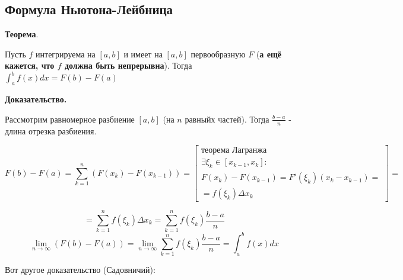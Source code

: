 \documentclass[a4paper]{article}
\begin{document}
\begin{definit}
\hypertarget{p13}{}
\subsection*{Формула Ньютона-Лейбница}

\begin{htheorem}\textbf{Теорема}.

Пусть $f$ интегрируема на $[a,b]$ и имеет на $[a,b]$ первообразную $F$ (\textbf{а ещё кажется, что $f$ должна быть непрерывна}). Тогда $\int_a^b f(x)dx = F(b) - F(a)$
\end{htheorem}

\begin{hproof}\textbf{Доказательство.}

Рассмотрим равномерное разбиение $[a,b]$ (на $n$ равныйх частей). Тогда $\frac{b-a}{n}$ - длина отрезка разбиения.

\[
F(b) - F(a) = \sum_{k=1}^n (F(x_{k}) - F(x_{k-1})) = \begin{bmatrix}
\text{теорема Лагранжа} \\
\exists \xi_k \in [x_{k-1}, x_{k}]: \\
F(x_k)-F(x_{k-1}) = F'(\xi_k)(x_k-x_{k-1}) = \\ = f(\xi_k) \Delta x_k
\end{bmatrix} = 
\]

\[
 = \sum_{k=1}^n f(\xi_k) \Delta x_k = \sum_{k=1}^n f(\xi_k) \frac{b-a}{n}
\]
\[
\lim_{n \rightarrow \infty} (F(b)-F(a)) = \lim_{n \rightarrow \infty} \sum_{k=1}^n f(\xi_k) \frac{b-a}{n} = \int_a^b f(x)dx
\]
\end{hproof}


Вот другое доказательство (Садовничий):


\end{definit}
\end{document}
